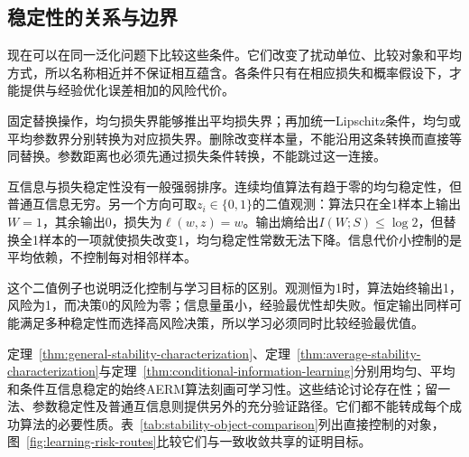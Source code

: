 \subsection{稳定性的关系与边界}
\label{sec:stability-comparison}

现在可以在同一泛化问题下比较这些条件。它们改变了扰动单位、比较对象和平均方式，所以名称相近并不保证相互蕴含。各条件只有在相应损失和概率假设下，才能提供与经验优化误差相加的风险代价。

固定替换操作，均匀损失界能够推出平均损失界；再加统一Lipschitz条件，均匀或平均参数界分别转换为对应损失界。删除改变样本量，不能沿用这条转换而直接等同替换。参数距离也必须先通过损失条件转换，不能跳过这一连接。

互信息与损失稳定性没有一般强弱排序。连续均值算法有趋于零的均匀稳定性，但普通互信息无穷。另一个方向可取$z_i\in\{0,1\}$的二值观测：算法只在全1样本上输出$W=1$，其余输出0，损失为$\ell(w,z)=w$。输出熵给出$I(W;S)\leq\log2$，但替换全1样本的一项就使损失改变1，均匀稳定性常数无法下降。信息代价小控制的是平均依赖，不控制每对相邻样本。

这个二值例子也说明泛化控制与学习目标的区别。观测恒为1时，算法始终输出1，风险为1，而决策0的风险为零；信息量虽小，经验最优性却失败。恒定输出同样可能满足多种稳定性而选择高风险决策，所以学习必须同时比较经验最优值。

定理~\ref{thm:general-stability-characterization}、定理~\ref{thm:average-stability-characterization}与定理~\ref{thm:conditional-information-learning}分别用均匀、平均和条件互信息稳定的始终AERM算法刻画可学习性。这些结论讨论存在性；留一法、参数稳定性及普通互信息则提供另外的充分验证路径。它们都不能转成每个成功算法的必要性质。表~\ref{tab:stability-object-comparison}列出直接控制的对象，图~\ref{fig:learning-risk-routes}比较它们与一致收敛共享的证明目标。

